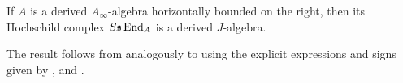 \documentclass[Thesis.tex]{subfiles}
\begin{document}
\begin{corollary}\label{dainftydeligne}
If $A$ is a derived $A_\infty$-algebra horizontally bounded on the right, then its Hochschild complex $S\mathfrak{s}\operatorname{End}_A$ is a derived $J$-algebra.
\end{corollary}
The result follows from  analogously to  using the explicit expressions and signs given by ,  and .
\end{document}
